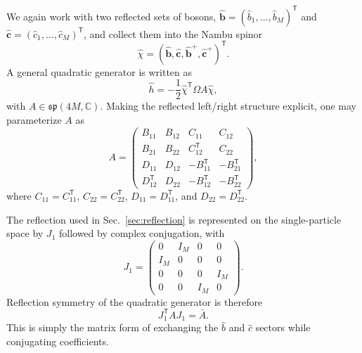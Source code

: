 \documentclass[twocolumn,aps,prb,10pt,amsmath,amssymb,amsthm,superscriptaddress]{revtex4-2}
\newcommand{\trans}{\mathsf{T}}
\newcommand{\bb}[1]{\bm{#1}}
\theoremstyle{remark}
\begin{document}
We again work with two reflected sets of bosons, $\hat{\bb b}=(\hat b_1,\ldots,\hat b_M)^\trans$ and $\hat{\bb c}=(\hat c_1,\ldots,\hat c_M)^\trans$, and collect them into the Nambu spinor
\begin{equation}
    \hat\chi = (\hat{\bb b},\hat{\bb c},\hat{\bb b}^+,\hat{\bb c}^+)^\trans.
\end{equation}
A general quadratic generator is written as
\begin{equation}
    \hat h = -\frac12\hat\chi^\trans\Omega A\hat\chi,
\end{equation}
with $A\in\mathfrak{sp}(4M,\mathbb C)$. Making the reflected left/right structure explicit, one may parameterize $A$ as
\begin{equation}
    A=
    \begin{pmatrix}
        B_{11} & B_{12} & C_{11} & C_{12} \\
        B_{21} & B_{22} & C_{12}^\trans & C_{22} \\
        D_{11} & D_{12} & -B_{11}^\trans & -B_{21}^\trans \\
        D_{12}^\trans & D_{22} & -B_{12}^\trans & -B_{22}^\trans
    \end{pmatrix},
    \label{eq:A_reflected_general}
\end{equation}
where $C_{11}=C_{11}^\trans$, $C_{22}=C_{22}^\trans$, $D_{11}=D_{11}^\trans$, and $D_{22}=D_{22}^\trans$.

The reflection used in Sec.~\ref{sec:reflection} is represented on the single-particle space by $J_1$ followed by complex conjugation, with
\begin{equation}
    J_1=
    \begin{pmatrix}
        0 & I_M & 0 & 0 \\
        I_M & 0 & 0 & 0 \\
        0 & 0 & 0 & I_M \\
        0 & 0 & I_M & 0
    \end{pmatrix}.
\end{equation}
Reflection symmetry of the quadratic generator is therefore
\begin{equation}
    J_1^\trans A J_1 = \bar A.
    \label{eq:J1_reflection_condition}
\end{equation}
This is simply the matrix form of exchanging the $\hat b$ and $\hat c$ sectors while conjugating coefficients.
\end{document}
